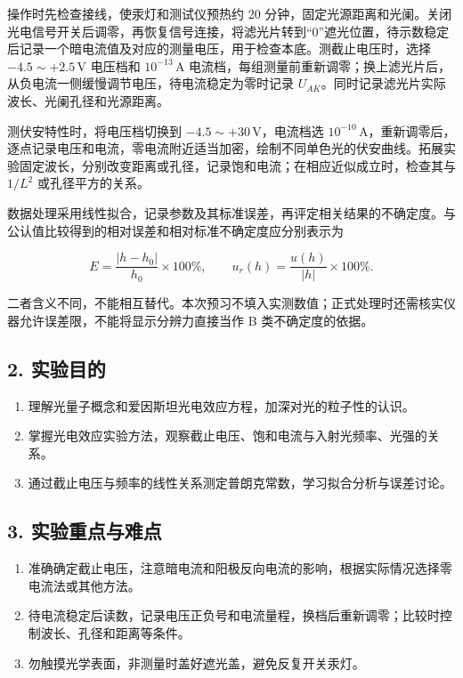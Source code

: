 \newpage
操作时先检查接线，使汞灯和测试仪预热约 20 分钟，固定光源距离和光阑。关闭光电信号开关后调零，再恢复信号连接，将滤光片转到“0”遮光位置，待示数稳定后记录一个暗电流值及对应的测量电压，用于检查本底。测截止电压时，选择 $-4.5\sim+2.5\,\mathrm{V}$ 电压档和 $10^{-13}\,\mathrm{A}$ 电流档，每组测量前重新调零；换上滤光片后，从负电流一侧缓慢调节电压，待电流稳定为零时记录 $U_{AK}$。同时记录滤光片实际波长、光阑孔径和光源距离。

测伏安特性时，将电压档切换到 $-4.5\sim+30\,\mathrm{V}$，电流档选 $10^{-10}\,\mathrm{A}$，重新调零后，逐点记录电压和电流，零电流附近适当加密，绘制不同单色光的伏安曲线。拓展实验固定波长，分别改变距离或孔径，记录饱和电流；在相应近似成立时，检查其与 $1/L^2$ 或孔径平方的关系。

数据处理采用线性拟合，记录参数及其标准误差，再评定相关结果的不确定度。与公认值比较得到的相对误差和相对标准不确定度应分别表示为

\begin{equation}
E=\frac{|h-h_0|}{h_0}\times100\%,\qquad u_r(h)=\frac{u(h)}{|h|}\times100\%.
\end{equation}

二者含义不同，不能相互替代。本次预习不填入实测数值；正式处理时还需核实仪器允许误差限，不能将显示分辨力直接当作 B 类不确定度的依据。

\subsection*{2. 实验目的}

\begin{enumerate}
\item 理解光量子概念和爱因斯坦光电效应方程，加深对光的粒子性的认识。
\item 掌握光电效应实验方法，观察截止电压、饱和电流与入射光频率、光强的关系。
\item 通过截止电压与频率的线性关系测定普朗克常数，学习拟合分析与误差讨论。
\end{enumerate}

\subsection*{3. 实验重点与难点}

\begin{enumerate}
\item 准确确定截止电压，注意暗电流和阳极反向电流的影响，根据实际情况选择零电流法或其他方法。
\item 待电流稳定后读数，记录电压正负号和电流量程，换档后重新调零；比较时控制波长、孔径和距离等条件。
\item 勿触摸光学表面，非测量时盖好遮光盖，避免反复开关汞灯。
\end{enumerate}


